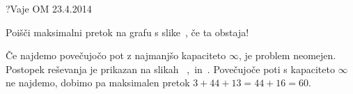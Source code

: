 \begin{naloga}{?}{Vaje OM 23.4.2014}
\begin{vprasanje}
Poišči maksimalni pretok na grafu s slike~\fig, če ta obstaja!

\begin{slika}
\pgfslika
{}
\end{slika}
\end{vprasanje}

\begin{odgovor}
Če najdemo povečujočo pot z najmanjšo kapaciteto $\infty$,
je problem neomejen.
Postopek reševanja je prikazan na slikah~%
\fig[pretok5a],~\fig[pretok5b] in~\fig[pretok5c].
Povečujoče poti s kapaciteto $\infty$ ne najdemo,
dobimo pa maksimalen pretok $3+44+13 = 44+16 = 60$.

\begin{slika}
\pgfslika[pretok5a]
\end{slika}
\begin{slika}
\pgfslika[pretok5b]
\end{slika}
\begin{slika}
\pgfslika[pretok5c]
\end{slika}
\end{odgovor}
\end{naloga}
